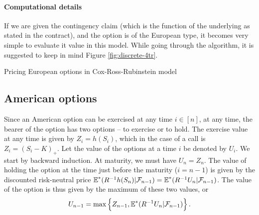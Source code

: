 \paragraph{Computational details}
If we are given the contingency claim (which is the function of the underlying as stated in the contract), and the option is of the European type, it becomes very simple to evaluate it value in this model. While going through the algorithm, it is suggested to keep in mind Figure \ref{fig:discrete-4tr}.

\begin{algorithm}[H]
	\DontPrintSemicolon
	
	
	
	
	\caption{Pricing European options in Cox-Ross-Rubinstein model}
	\label{alg:discrete-eu}
\end{algorithm}



\subsection{American options}

Since an American option can be exercised at any time $ i \in [n] $, at any time, the bearer of the option has two options -- to exercise or to hold. The exercise value at any time is given by $ Z_i = h(S_i) $, which in the case of a call is $ Z_i = (S_i - K)_+ $. Let the value of the options at a time $ i $ be denoted by $ U_i $. We start by backward induction. At maturity, we must have $ U_n = Z_n $. The value of holding the option at the time just before the maturity ($ i = n-1 $) is given by the discounted risk-neutral price $ \operatorname{\mathbb{E}}^*( R^{-1} h(S_n) | \mathcal{F}_{n-1} ) = \operatorname{\mathbb{E}}^*( R^{-1} U_n | \mathcal{F}_{n-1} ) $. The value of the option is thus given by the maximum of these two values, or
\begin{equation}
	U_{n-1} = \max \left\lbrace Z_{n-1}, \operatorname{\mathbb{E}}^*( R^{-1} U_n | \mathcal{F}_{n-1} ) \right\rbrace .
\end{equation}

